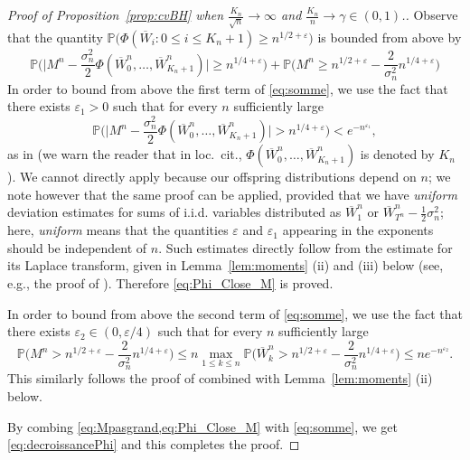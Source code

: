 \documentclass[10pt]{amsart}
\theoremstyle{definition}\newtheorem{defi}[theo]{Definition}\newtheorem{rema}[theo]{Remark}\newtheorem{exam}[theo]{Example}\newtheorem{exem}[theo]{Example}\newtheorem{nota}[theo]{Notation}
\renewcommand{\P}{\mathbb{P}}
\def\eps{\varepsilon}
\renewcommand{\epsilon}{\varepsilon}
\begin{document}
\begin{proof}[Proof of  Proposition~\ref{prop:cvBH}  when $\tfrac{K_{n}}{\sqrt{n}} \rightarrow \infty$ and $ \tfrac{K_{n}}{n}  \rightarrow \gamma \in (0,1)$.]
Observe that the quantity $ \P\big(\Phi( \overline{W}_{i} :0 \leq i \leq K_{n}+1) \geq n^{1/2+\epsilon}
  \big) $ is bounded from above by
\begin{equation}
\label{eq:somme} \P\bigg( \big|M^n-\frac{\sigma_n^2}{2}\Phi(\overline{W}^{n}_0,\dots,\overline{W}^{n}_{K_n+1})\big|
  \geq n^{1/4+\eps} \bigg) + \P\bigg( M^n  \geq n^{1/2+\eps}- \frac{2}{\sigma_{n}^{2}} n^{1/4+\epsilon} \bigg)
\end{equation}
In order to bound from above the first term of \eqref{eq:somme}, we use the fact that there exists $\epsilon_{1}>0$ such that for every $n$ sufficiently large
\begin{equation}
  \P\bigg( \big|M^n-\frac{\sigma_n^2}{2}\Phi(\overline{W}^{n}_0,\dots,\overline{W}^{n}_{K_n+1})\big|
  >n^{1/4+\eps} \bigg) < e^{-n^{\eps_{1}}},
\label{eq:Phi_Close_M}
\end{equation}
as in \cite[Lemma 1.11]{LG05} (we warn the reader that in loc.\ cit.,
$\Phi(\overline{W}^{n}_0,\dots,\overline{W}^{n}_{K_n+1})$ is denoted by $K_n$).
We cannot directly apply \cite[Lemma 1.11]{LG05} because our offspring distributions depend on $n$;
we note however that the same proof can be applied,
provided that we have {\em uniform} deviation estimates for sums of i.i.d. variables
distributed as $\overline{W}^{n}_{1}$ or $\overline{W}^{n}_{T^n}-\tfrac12 \sigma_n^2$;
here, {\em uniform} means that the quantities $\eps$ and $\eps_{1}$ appearing
in the exponents should be independent of $n$.
Such estimates directly follow from the estimate for its Laplace transform,
given in Lemma~\ref{lem:moments} (ii) and (iii) below (see, e.g., the proof of \cite[Lemma 1.12]{LG05}).
Therefore \eqref{eq:Phi_Close_M} is proved.

In order to bound from above the second term of \eqref{eq:somme}, we use the fact that there exists $\epsilon_{2} \in (0,\epsilon/4)$ such that for every $n$ sufficiently large
\begin{equation}
\label{eq:Mpasgrand}
\P\bigg( M^n  >n^{1/2+\eps}- \frac{2}{\sigma_{n}^{2}} n^{1/4+\epsilon} \bigg) \leq  n \max_{1 \leq k \leq n} \P\bigg( \overline{W}^{n}_{k}>n^{1/2+\eps}- \frac{2}{\sigma_{n}^{2}} n^{1/4+\epsilon} \bigg) \leq n e^{-n^{\epsilon_{2}}}.
\end{equation}This similarly follows the proof of \cite[Lemma 1.12]{LG05} combined with Lemma~\ref{lem:moments} (ii) below.

By combing \cref{eq:Mpasgrand,eq:Phi_Close_M} with \eqref{eq:somme}, we get \eqref{eq:decroissancePhi} and this completes the proof.
\end{proof}
\end{document}
